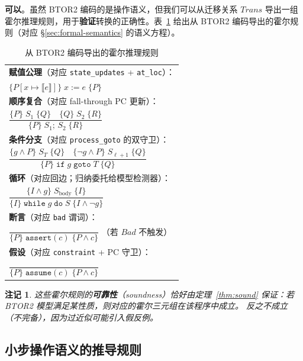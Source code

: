 \documentclass[11pt,a4paper]{article}
\newtheorem{remark}{注记}[section]
\newcommand{\Trans}{\mathit{Trans}}
\newcommand{\Bad}{\mathit{Bad}}
\newcommand{\eval}[1]{\llbracket #1 \rrbracket}
\begin{document}
\textbf{可以}。虽然 BTOR2 编码的是操作语义，但我们可以从迁移关系 $\Trans$
导出一组霍尔推理规则，用于\textbf{验证}转换的正确性。表~\ref{tab:hoare}
给出从 BTOR2 编码导出的霍尔规则（对应 \S\ref{sec:formal-semantics} 的语义方程）。

\begin{table}[h]
  \centering
  \small
  \caption{从 BTOR2 编码导出的霍尔推理规则}
  \label{tab:hoare}
  \renewcommand{\arraystretch}{1.8}
  \begin{tabular}{l}
    \toprule
    \textbf{赋值公理}（对应 \texttt{state\_updates} + \texttt{at\_loc}）： \\
    $\{P[x \mapsto \eval{e}]\}\;x {:=} e\;\{P\}$ \\
    \midrule
    \textbf{顺序复合}（对应 fall-through PC 更新）： \\
    $\dfrac{\{P\}\;S_1\;\{Q\} \quad \{Q\}\;S_2\;\{R\}}
           {\{P\}\;S_1;\,S_2\;\{R\}}$ \\
    \midrule
    \textbf{条件分支}（对应 \texttt{process\_goto} 的双守卫）： \\
    $\dfrac{\{g \wedge P\}\;S_T\;\{Q\} \quad \{\neg g \wedge P\}\;S_{\ell+1}\;\{Q\}}
           {\{P\}\;\texttt{if}\;g\;\texttt{goto}\;T\;\{Q\}}$ \\
    \midrule
    \textbf{循环}（对应回边；归纳委托给模型检测器）： \\
    $\dfrac{\{I \wedge g\}\;S_{\mathrm{body}}\;\{I\}}
           {\{I\}\;\texttt{while}\;g\;\texttt{do}\;S\;\{I \wedge \neg g\}}$ \\
    \midrule
    \textbf{断言}（对应 \texttt{bad} 谓词）： \\
    $\dfrac{}{\{P\}\;\texttt{assert}(c)\;\{P \wedge c\}}$
       \quad（若 $\Bad$ 不触发） \\
    \midrule
    \textbf{假设}（对应 \texttt{constraint} + PC 守卫）： \\
    $\dfrac{}{\{P\}\;\texttt{assume}(c)\;\{P \wedge c\}}$ \\
    \bottomrule
  \end{tabular}
\end{table}

\begin{remark}
  这些霍尔规则的\textbf{可靠性}（soundness）恰好由定理~\ref{thm:sound}
  保证：若 BTOR2 模型满足某性质，则对应的霍尔三元组在该程序中成立。
  反之不成立（不完备），因为过近似可能引入假反例。
\end{remark}

\subsection{小步操作语义的推导规则}
\label{sec:sos-rules}
\end{document}
